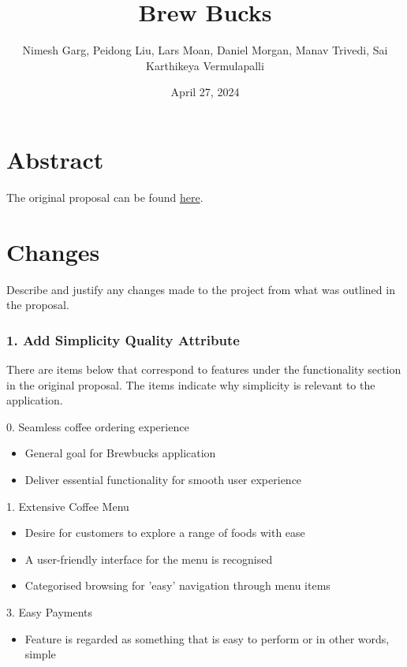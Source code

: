 \documentclass{article}
\title{Brew Bucks}
\author{Nimesh Garg, Peidong Liu, Lars Moan, Daniel Morgan, Manav Trivedi, Sai Karthikeya Vermulapalli}
\date{April 27, 2024}
\begin{document}
\maketitle
\pagebreak

\tableofcontents
\pagebreak

\section{Abstract}
The original proposal can be found \href{https://csse6400.github.io/project-proposal-2024/s4780791/proposal.html}{here}.

\section{Changes}
Describe and justify any changes made to the project from what was outlined in the proposal.

\subsubsection*{1. Add Simplicity Quality Attribute}
There are items below that correspond to features under the functionality section in the original proposal. The items indicate why simplicity is relevant to the application.

\medskip \begin{minipage}{\dimexpr\textwidth-0.25cm}
0. Seamless coffee ordering experience
\begin{itemize}
    \item General goal for Brewbucks application
    \item Deliver essential functionality for smooth user experience
\end{itemize}

1. Extensive Coffee Menu 
\begin{itemize}
    \item Desire for customers to explore a range of foods with ease
    \item A user-friendly interface for the menu is recognised
    \item Categorised browsing for 'easy' navigation through menu items
\end{itemize}

3. Easy Payments
\begin{itemize}
    \item Feature is regarded as something that is easy to perform or in other words, simple
\end{itemize}
\end{minipage}
\end{document}
